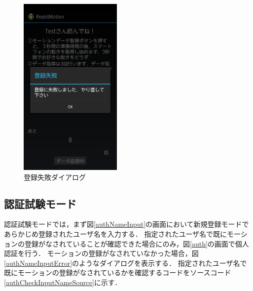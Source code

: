 \documentclass[12pt]{jreport}
\begin{document}
\begin{figure}[bthp]
\begin{minipage}{0.33\hsize}
            \end{minipage}
            \begin{minipage}{0.32\hsize}
                \begin{center}
                    \includegraphics[width=5cm, bb=0 0 540 960]{RegFail.pdf}
                \end{center}
                \caption{登録失敗ダイアログ}
                \label{regFail}
            \end{minipage}
        \end{figure}

        \subsection{認証試験モード}
        認証試験モードでは，まず図\ref{authNameInput}の画面において新規登録モードであらかじめ登録されたユーザ名を入力する．
        指定されたユーザ名で既にモーションの登録がなされていることが確認できた場合にのみ，図\ref{auth}の画面で個人認証を行う．
        モーションの登録がなされていなかった場合，図\ref{authNameInputError}のようなダイアログを表示する．
        指定されたユーザ名で既にモーションの登録がなされているかを確認するコードをソースコード\ref{authCheckInputNameSource}に示す．
\end{document}
